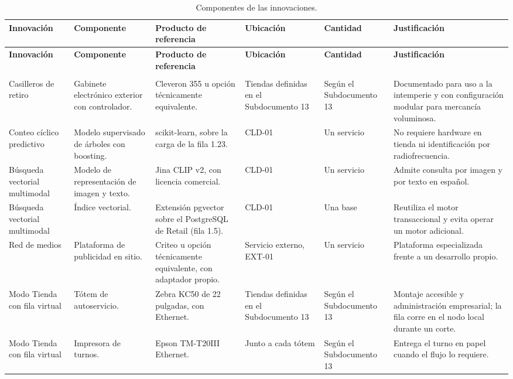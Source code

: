 \documentclass[11pt]{article}
\begin{document}
{\footnotesize
\begin{longtable}[]{@{}
  >{\raggedright\arraybackslash}p{}
  >{\raggedright\arraybackslash}p{}
  >{\raggedright\arraybackslash}p{}
  >{\raggedright\arraybackslash}p{}
  >{\raggedright\arraybackslash}p{}
  >{\raggedright\arraybackslash}p{}@{}}
\caption{Componentes de las innovaciones.}\label{tab:t11-10}\\
\toprule\noalign{}
\textbf{Innovación} & \textbf{Componente} & \textbf{Producto de referencia} & \textbf{Ubicación} & \textbf{Cantidad} & \textbf{Justificación} \\
\midrule\noalign{}
\endfirsthead
\toprule\noalign{}
\textbf{Innovación} & \textbf{Componente} & \textbf{Producto de referencia} & \textbf{Ubicación} & \textbf{Cantidad} & \textbf{Justificación} \\
\midrule\noalign{}
\endhead
\bottomrule\noalign{}
\multicolumn{6}{@{}p{\columnwidth}@{}}{\rule{0pt}{3.2ex}\textbf{Fuente:} Elaboración propia a partir del Subdocumento 13.} \\
\endlastfoot
Casilleros de retiro & Gabinete electrónico exterior con controlador. & Cleveron 355 u opción técnicamente equivalente. & Tiendas definidas en el Subdocumento 13 & Según el Subdocumento 13 & Documentado para uso a la intemperie y con configuración modular para mercancía voluminosa. \\ \addlinespace
Conteo cíclico predictivo & Modelo supervisado de árboles con boosting. & scikit-learn, sobre la carga de la fila 1.23. & CLD-01 & Un servicio & No requiere hardware en tienda ni identificación por radiofrecuencia. \\ \addlinespace
Búsqueda vectorial multimodal & Modelo de representación de imagen y texto. & Jina CLIP v2, con licencia comercial. & CLD-01 & Un servicio & Admite consulta por imagen y por texto en español. \\ \addlinespace
Búsqueda vectorial multimodal & Índice vectorial. & Extensión pgvector sobre el PostgreSQL de Retail (fila 1.5). & CLD-01 & Una base & Reutiliza el motor transaccional y evita operar un motor adicional. \\ \addlinespace
Red de medios & Plataforma de publicidad en sitio. & Criteo u opción técnicamente equivalente, con adaptador propio. & Servicio externo, EXT-01 & Un servicio & Plataforma especializada frente a un desarrollo propio. \\ \addlinespace
Modo Tienda con fila virtual & Tótem de autoservicio. & Zebra KC50 de 22 pulgadas, con Ethernet. & Tiendas definidas en el Subdocumento 13 & Según el Subdocumento 13 & Montaje accesible y administración empresarial; la fila corre en el nodo local durante un corte. \\ \addlinespace
Modo Tienda con fila virtual & Impresora de turnos. & Epson TM-T20III Ethernet. & Junto a cada tótem & Según el Subdocumento 13 & Entrega el turno en papel cuando el flujo lo requiere. \\
\end{longtable}
}
\end{document}
